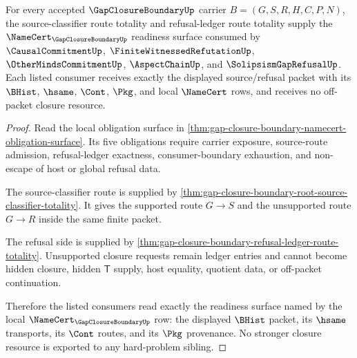 \begin{theorem}
\label{thm:gap-closure-boundary-consumer-namecert-readiness}
For every accepted $\GapClosureBoundaryUp$ carrier $B=(G,S,R,H,C,P,N)$, the source-classifier route totality and refusal-ledger route totality supply the $\NameCert_{\GapClosureBoundaryUp}$ readiness surface consumed by $\CausalCommitmentUp$, $\FiniteWitnessedRefutationUp$, $\OtherMindsCommitmentUp$, $\AspectChainUp$, and $\SolipsismGapRefusalUp$. Each listed consumer receives exactly the displayed source/refusal packet with its $\BHist$, $\hsame$, $\Cont$, $\Pkg$, and local $\NameCert$ rows, and receives no off-packet closure resource.
\end{theorem}
\begin{proof}
Read the local obligation surface in \autoref{thm:gap-closure-boundary-namecert-obligation-surface}. Its five obligations require carrier exposure, source-route admission, refusal-ledger exactness, consumer-boundary exhaustion, and non-escape of host or global refusal data.

The source-classifier route is supplied by \autoref{thm:gap-closure-boundary-root-source-classifier-totality}. It gives the supported route $G \longrightarrow S$ and the unsupported route $G \longrightarrow R$ inside the same finite packet.

The refusal side is supplied by \autoref{thm:gap-closure-boundary-refusal-ledger-route-totality}. Unsupported closure requests remain ledger entries and cannot become hidden closure, hidden $\mathsf{T}$ supply, host equality, quotient data, or off-packet continuation.

Therefore the listed consumers read exactly the readiness surface named by the local $\NameCert_{\GapClosureBoundaryUp}$ row: the displayed $\BHist$ packet, its $\hsame$ transports, its $\Cont$ routes, and its $\Pkg$ provenance. No stronger closure resource is exported to any hard-problem sibling.
\end{proof}
